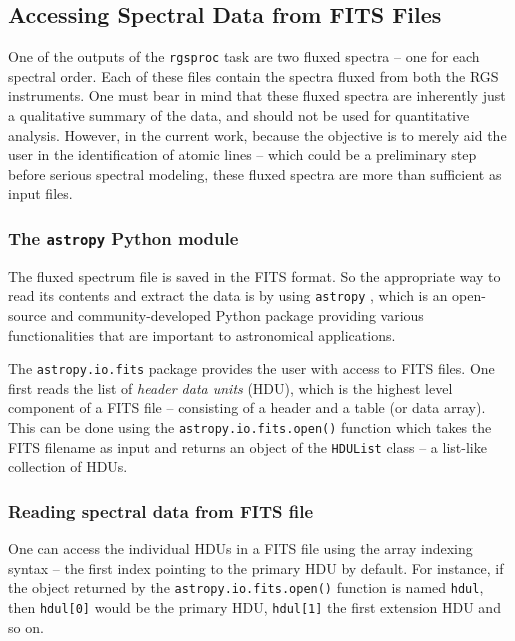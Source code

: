         \subsection{Accessing Spectral Data from FITS Files} \label{tool:rgs-files:access}
            One of the outputs of the \texttt{rgsproc} task are two fluxed spectra -- one for each spectral order. Each of these files contain the spectra fluxed from both the RGS instruments. One must bear in mind that these fluxed spectra are inherently just a qualitative summary of the data, and should not be used for quantitative analysis. However, in the current work, because the objective is to merely aid the user in the identification of atomic lines -- which could be a preliminary step before serious spectral modeling, these fluxed spectra are more than sufficient as input files.
            
            \subsubsection{The \texttt{astropy} Python module} \label{tool:rgs-files:access:astropy}
                The fluxed spectrum file is saved in the FITS format. So the appropriate way to read its contents and extract the data is by using \texttt{astropy} \cite{robitaille2013astropy}, which is an open-source and community-developed Python package providing various functionalities that are important to astronomical applications.
                
                The \texttt{astropy.io.fits} package provides the user with access to FITS files. One first reads the list of \textit{header data units} (HDU), which is the highest level component of a FITS file -- consisting of a header and a table (or data array). This can be done using the \texttt{astropy.io.fits.open()} function which takes the FITS filename as input and returns an object of the \texttt{HDUList} class -- a list-like collection of HDUs.
            
            \subsubsection{Reading spectral data from FITS file} \label{tool:rgs-files:access:io}
                One can access the individual HDUs in a FITS file using the array indexing syntax -- the first index pointing to the primary HDU by default. For instance, if the object returned by the \texttt{astropy.io.fits.open()} function is named \texttt{hdul}, then \texttt{hdul[0]} would be the primary HDU, \texttt{hdul[1]} the first extension HDU and so on.
                
